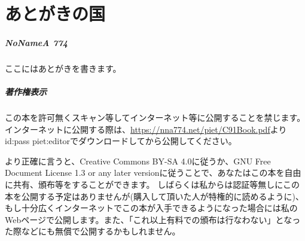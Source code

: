 \chapter[あとがきの国]{あとがきの国}

\paragraph{NoNameA 774}

ここにはあとがきを書きます。

\paragraph{著作権表示}

{\small この本を許可無くスキャン等してインターネット等に公開することを禁じます。
インターネットに公開する際は、\url{https://nna774.net/piet/C91Book.pdf}よりid:pass piet:editorでダウンロードしてから公開してください。}

{\footnotesize より正確に言うと、Creative Commons BY-SA 4.0に従うか、GNU Free Document License 1.3 or any later versionに従うことで、あなたはこの本を自由に共有、頒布等をすることができます。
しばらくは私からは認証等無しにこの本を公開する予定はありませんが(購入して頂いた人が特権的に読めるように)、もし十分広くインターネットでこの本が入手できるようになった場合には私のWebページで公開します。また、「これ以上有料での頒布は行なわない」となった際などにも無償で公開するかもしれません。}
